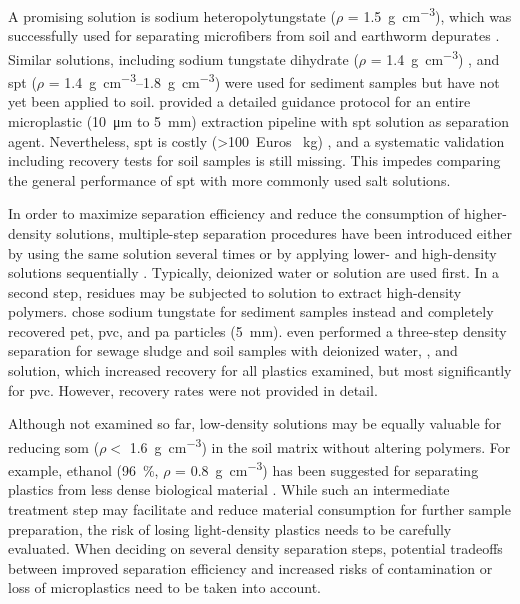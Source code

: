 A promising solution is sodium heteropolytungstate ($\rho$
= \SI{1.5}{\gram\per\cubic\centi\meter}), which was successfully used for separating microfibers from soil and earthworm depurates \citep{Prendergast-MillerPolyesterderived2019}. Similar solutions, including sodium tungstate dihydrate ($\rho$ = \SI{1.4}{\gram\per\cubic\centi\meter}) \citep{FriasStandardised2018}, and \ac{spt}
($\rho$ = \SIrange{1.4}{1.8}{\gram\per\cubic\centi\meter}) \citep{BallentSources2016,EndersTracing2019,EndersWhen2020,CorcoranPlastics2009} were used for sediment samples but have not yet been applied to soil.
 provided a detailed guidance protocol for an entire microplastic (\SI{10}{\micro\meter} to \SI{5}{\milli\meter}) extraction pipeline with \ac{spt}
solution as separation agent. Nevertheless, \ac{spt} is costly (\num{>100}~Euros \si{\per\kilo\gram}) \citep{CampanalePractical2020}, and a systematic validation including recovery tests for soil samples is still missing. This impedes comparing the general performance of \ac{spt}
with more commonly used salt solutions.

In order to maximize separation efficiency and reduce the consumption of higher-density solutions, multiple-step separation procedures have been introduced either by using the same solution several times \citep{LiuMicroplastic2018,HuangAgricultural2020} or by applying lower- and high-density solutions sequentially \citep{NuelleNew2014,HurleyValidation2018,CorradiniEvidence2019,vandenBergSewage2020,DekiffOccurrence2014,ZhouDistribution2018}. Typically, deionized water \citep{vandenBergSewage2020,HurleyValidation2018} or  solution \citep{NuelleNew2014,DekiffOccurrence2014,ZhouDistribution2018,FrereInfluence2017} are used first. In a second step, residues may be subjected to  solution to extract high-density polymers.  chose sodium tungstate for sediment samples instead and completely recovered \ac{pet},
\ac{pvc}, and \ac{pa} particles (\SI{5}{\milli\meter}).  even performed a three-step density separation for sewage sludge and soil samples with deionized water, , and  solution, which increased recovery for all plastics examined, but most significantly for
\ac{pvc}. However, recovery rates were not provided in detail.

Although not examined so far, low-density solutions may be equally valuable for reducing \ac{som} ($\rho <$ \SI{1.6}{\gram\per\cubic\centi\meter}) \citep{CerliSeparation2012} in the soil matrix without altering polymers. For example, ethanol (\SI{96}{\percent}, $\rho$ = \SI{0.8}{\gram\per\cubic\centi\meter}) has been suggested for separating plastics from less dense biological material \citep{HerreraNovel2018}. While such an intermediate treatment step may facilitate and reduce material consumption for further sample preparation, the risk of losing light-density plastics needs to be carefully evaluated. When deciding on several density separation steps, potential tradeoffs between improved separation efficiency and increased risks of contamination or loss of microplastics need to be taken into account.

